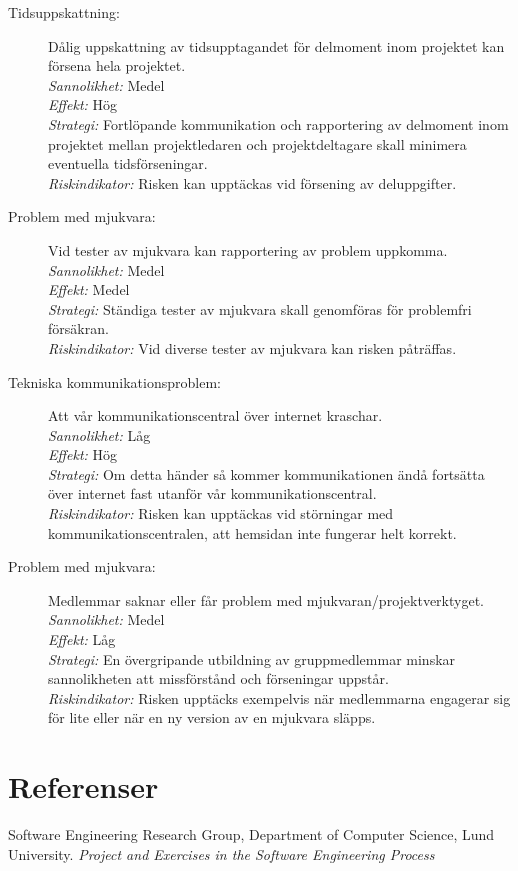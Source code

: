 \documentclass[a4paper]{article}
\begin{document}
\begin{description}
\item[Tidsuppskattning:]
Dålig uppskattning av tidsupptagandet för delmoment inom projektet kan försena
 hela projektet. \\
\emph{Sannolikhet:}
Medel \\
\emph{Effekt:}
Hög \\
\emph{Strategi:}
Fortlöpande kommunikation och rapportering av delmoment inom projektet mellan
 projektledaren och projektdeltagare skall minimera eventuella
 tidsförseningar. \\
\emph{Riskindikator:}
Risken kan upptäckas vid försening av deluppgifter.

\item[Problem med mjukvara:]
Vid tester av mjukvara kan rapportering av problem uppkomma. \\
\emph{Sannolikhet:}
Medel \\
\emph{Effekt:}
Medel \\
\emph{Strategi:}
Ständiga tester av mjukvara skall genomföras för problemfri försäkran. \\
\emph{Riskindikator:}
Vid diverse tester av mjukvara kan risken påträffas.

\item[Tekniska kommunikationsproblem:]
Att vår kommunikationscentral över internet kraschar. \\
\emph{Sannolikhet:}
Låg \\
\emph{Effekt:}
Hög \\
\emph{Strategi:}
Om detta händer så kommer kommunikationen ändå fortsätta över internet fast
 utanför vår kommunikationscentral. \\
\emph{Riskindikator:}
Risken kan upptäckas vid störningar med kommunikationscentralen, att hemsidan
 inte fungerar helt korrekt.
 
 \item[Problem med mjukvara:]
Medlemmar saknar eller får problem med mjukvaran/projektverktyget. \\
\emph{Sannolikhet:}
Medel \\
\emph{Effekt:}
Låg \\
\emph{Strategi:}
En övergripande utbildning av gruppmedlemmar minskar sannolikheten att missförstånd och förseningar uppstår. \\
\emph{Riskindikator:}
Risken upptäcks exempelvis när medlemmarna engagerar sig för lite eller när en ny version av en mjukvara släpps.
\end{description}
\section{Referenser}
\renewcommand*{\refname}{}
\vspace{-1cm} %

\begin{thebibliography}{99}
 Software Engineering Research Group, Department of Computer Science, Lund University. \emph{Project and Exercises in the Software Engineering Process}
\end{thebibliography}
\end{document}
